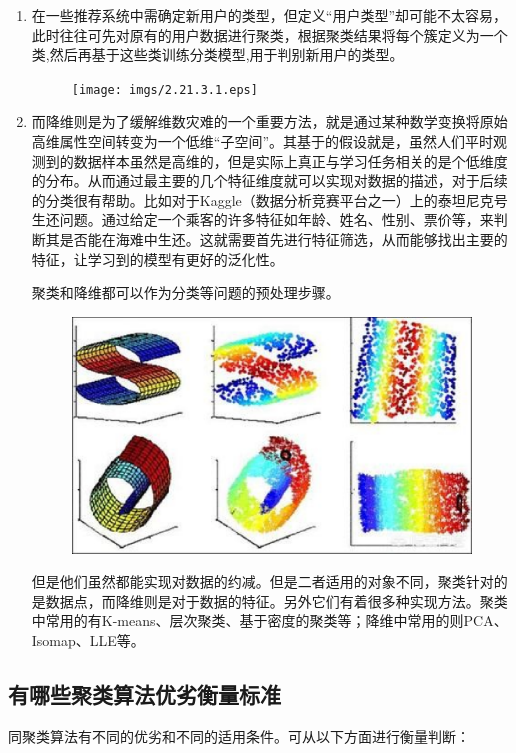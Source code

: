 \begin{enumerate}\itemsep0em
		\item 在一些推荐系统中需确定新用户的类型，但定义``用户类型''却可能不太容易，此时往往可先对原有的用户数据进行聚类，根据聚类结果将每个簇定义为一个类,然后再基于这些类训练分类模型,用于判别新用户的类型。

			\begin{figure}[h]
				\centering
				\texttt{[image: imgs/2.21.3.1.eps]}
			\end{figure}

		\item 而降维则是为了缓解维数灾难的一个重要方法，就是通过某种数学变换将原始高维属性空间转变为一个低维``子空间''。其基于的假设就是，虽然人们平时观测到的数据样本虽然是高维的，但是实际上真正与学习任务相关的是个低维度的分布。从而通过最主要的几个特征维度就可以实现对数据的描述，对于后续的分类很有帮助。比如对于Kaggle（数据分析竞赛平台之一）上的泰坦尼克号生还问题。通过给定一个乘客的许多特征如年龄、姓名、性别、票价等，来判断其是否能在海难中生还。这就需要首先进行特征筛选，从而能够找出主要的特征，让学习到的模型有更好的泛化性。

			聚类和降维都可以作为分类等问题的预处理步骤。

		\begin{figure}[h]
			\centering
			\includegraphics[width=.7\textwidth]{imgs/2-19.eps}
		\end{figure}

		但是他们虽然都能实现对数据的约减。但是二者适用的对象不同，聚类针对的是数据点，而降维则是对于数据的特征。另外它们有着很多种实现方法。聚类中常用的有K-means、层次聚类、基于密度的聚类等；降维中常用的则PCA、Isomap、LLE等。
\end{enumerate}


\subsection{有哪些聚类算法优劣衡量标准}

 同聚类算法有不同的优劣和不同的适用条件。可从以下方面进行衡量判断：

